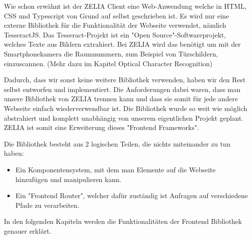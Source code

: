 
Wie schon erwähnt ist der ZELIA Client eine Web-Anwendung welche in HTML, CSS und Typescript von Grund auf selbst geschrieben ist. Es wird nur eine externe Bibliothek für die Funktionalität der Webseite verwendet, nämlich TesseractJS. Das Tesseract-Projekt ist ein "Open Source"-Softwareprojekt, welches Texte aus Bildern extrahiert. Bei ZELIA wird das benötigt um mit der Smartphonekamera die Raumnummern, zum Beispiel von Türschildern, einzuscannen. (Mehr dazu im Kapitel Optical Character Recognition)

Dadurch, dass wir sonst keine weitere Bibliothek verwenden, haben wir den Rest selbst entworfen und implementiert. Die Anforderungen dabei waren, dass man unsere Bibliothek von ZELIA trennen kann und dass sie somit für jede andere Webseite einfach wiederverwendbar ist. Die Bibliothek wurde so weit wie möglich abstrahiert und komplett unabhängig von unserem eigentlichen Projekt geplant. ZELIA ist somit eine Erweiterung dieses "Frontend Frameworks".

Die Bibliothek besteht aus 2 logischen Teilen, die nichts miteinander zu tun haben:
\begin{itemize}
    \item Ein Komponentensystem, mit dem man Elemente auf die Webseite hinzufügen und manipulieren kann. 
    \item Ein "Frontend Router", welcher dafür zuständig ist Anfragen auf verschiedene Pfade zu verarbeiten.
\end{itemize}

In den folgenden Kapiteln werden die Funktionalitäten der Frontend Bibliothek genauer erklärt.